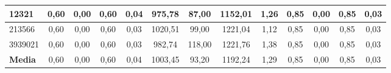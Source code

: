 \documentclass[12pt, spanish]{article}
\begin{document}
\begin{table}[H]
\begin{adjustwidth}{-1cm}{-1cm}
\begin{tabular}{|l|c|c|c|c|c|c|c|c|c|c|c|c|}
12321                                                   & 0,60                         & 0,00                           & 0,60                      & 0,04                   & 975,78                       & 87,00                          & 1152,01                   & 1,26                   & 0,85                         & 0,00                           & 0,85                      & 0,03                   \\ \hline
213566                                                  & 0,60                         & 0,00                           & 0,60                      & 0,03                   & 1020,51                      & 99,00                          & 1221,04                   & 1,12                   & 0,85                         & 0,00                           & 0,85                      & 0,03                   \\ \hline
3939021                                                 & 0,60                         & 0,00                           & 0,60                      & 0,03                   & 982,74                       & 118,00                         & 1221,76                   & 1,38                   & 0,85                         & 0,00                           & 0,85                      & 0,03                   \\ \hline
\textbf{Media}                                          & 0,60                         & 0,00                           & 0,60                      & 0,04                   & 1003,45                      & 93,20                          & 1192,24                   & 1,29                   & 0,85                         & 0,00                           & 0,85                      & 0,03                   \\ \hline
\end{tabular}
\end{adjustwidth}

\end{table}
\end{document}
